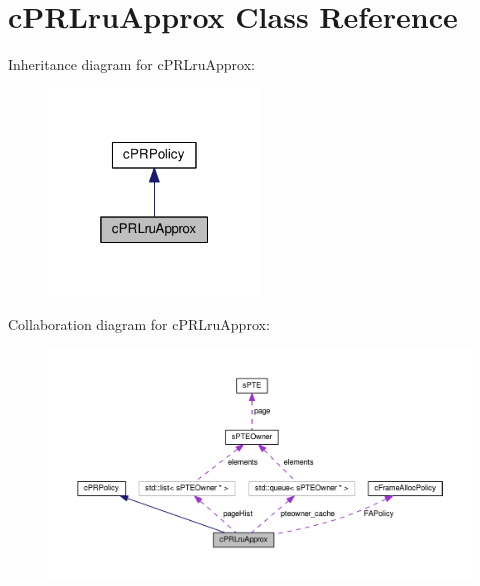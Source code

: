 \hypertarget{classcPRLruApprox}{\section{c\-P\-R\-Lru\-Approx \-Class \-Reference}
\label{d1/d58/classcPRLruApprox}
}


\-Inheritance diagram for c\-P\-R\-Lru\-Approx\-:\nopagebreak
\begin{figure}[H]
\begin{center}
\leavevmode
\includegraphics[width=160pt]{d2/d0a/classcPRLruApprox__inherit__graph}
\end{center}
\end{figure}


\-Collaboration diagram for c\-P\-R\-Lru\-Approx\-:\nopagebreak
\begin{figure}[H]
\begin{center}
\leavevmode
\includegraphics[width=350pt]{d0/d7d/classcPRLruApprox__coll__graph}
\end{center}
\end{figure}

